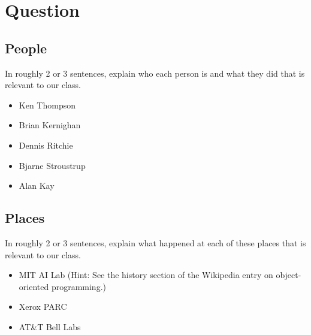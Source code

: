 




\docCopyright

\section{Question}

\subsection*{People}
In roughly 2 or 3 sentences, explain who each person is and what they did that
is relevant to our class.
\textQuestion{\makeDashedLine}
\begin{itemize}
  \item Ken Thompson
    \vfill\textQuestion{\makeDashedLine}
  \item Brian Kernighan
    \vfill\textQuestion{\makeDashedLine}
  \item Dennis Ritchie
    \vfill\textQuestion{\makeDashedLine}
  \item Bjarne Stroustrup
    \vfill\textQuestion{\makeDashedLine}
  \item Alan Kay
    \vfill
\end{itemize}

\newpage

\subsection*{Places}
In roughly 2 or 3 sentences, explain what happened at each of these places that is relevant to our class.
\textQuestion{\makeDashedLine}
\begin{itemize}
  \item MIT AI Lab (Hint: See the history section of the Wikipedia entry on
    object-oriented programming.)
    \vfill\textQuestion{\makeDashedLine}
  \item Xerox PARC
    \vfill\textQuestion{\makeDashedLine}
  \item AT\&T Bell Labs
    \vfill
\end{itemize}

